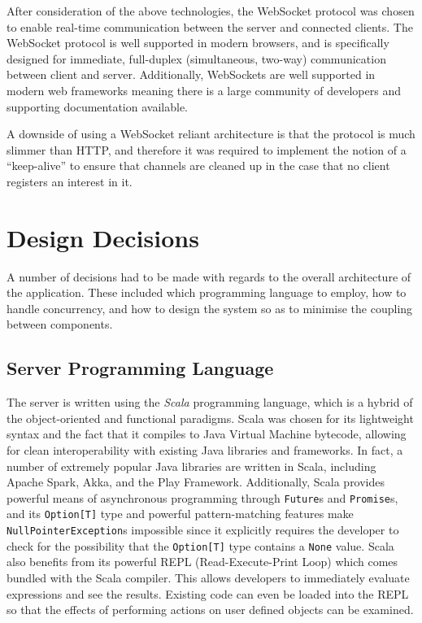 \documentclass{l4proj}
\newcommand{\code}[1]{\texttt{#1}}
\begin{document}
       After consideration of the above technologies, the WebSocket protocol was chosen to enable real-time communication between the server and connected clients. The WebSocket protocol is well supported in modern browsers, and is specifically designed for immediate, full-duplex (simultaneous, two-way) communication between client and server. Additionally, WebSockets are well supported in modern web frameworks meaning there is a large community of developers  and supporting documentation available.
          
        A downside of using a WebSocket reliant architecture is that the protocol is much slimmer than HTTP, and therefore it was required to implement the notion of a ``keep-alive'' to ensure that channels are cleaned up in the case that no client registers an interest in it.


    \section{Design Decisions}

    A number of decisions had to be made with regards to the overall architecture of the application. These included which programming language to employ, how to handle concurrency, and how to design the system so as to minimise the coupling between components.

    \subsection{Server Programming Language}
            The server is written using the \textit{Scala} programming language, which is a hybrid of the object-oriented and functional paradigms. Scala was chosen for its lightweight syntax and the fact that it compiles to Java Virtual Machine bytecode, allowing for clean interoperability with existing Java libraries and frameworks. In fact, a number of extremely popular Java libraries are written in Scala, including Apache Spark, Akka, and the Play Framework. Additionally, Scala provides powerful means of asynchronous programming through \code{Future}s and \code{Promise}s, and its \code{Option[T]} type and powerful pattern-matching features make \code{NullPointerException}s impossible since it explicitly requires the developer to check for the possibility that the \code{Option[T]} type contains a \code{None} value. Scala also benefits from its powerful REPL (Read-Execute-Print Loop) which comes bundled with the Scala compiler. This allows developers to immediately evaluate expressions and see the results. Existing code can even be loaded into the REPL so that the effects of performing actions on user defined objects can be examined.
            
\end{document}
